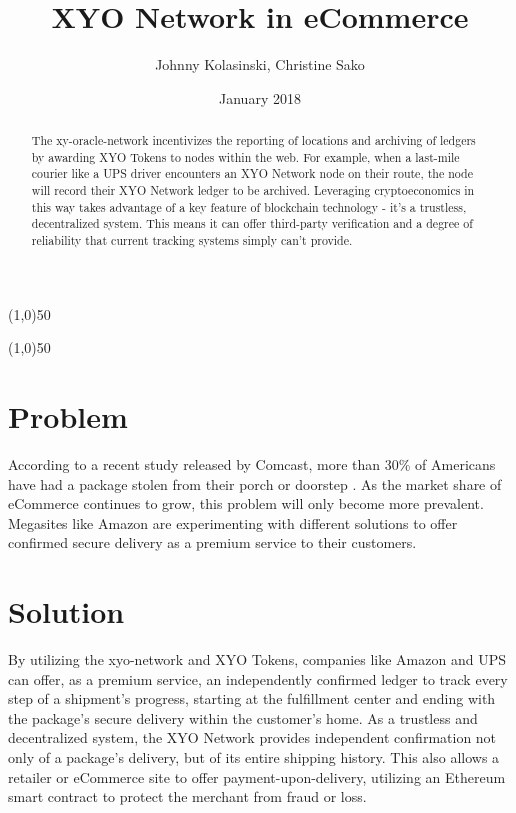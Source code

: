 \documentclass{article}
\title {XYO Network in eCommerce}
\author{Johnny Kolasinski, Christine Sako}
\date{January 2018}
\begin{document}
\maketitle
\tableofcontents

\begin{center}
\line(1,0){50}
\end{center}

\begin{abstract}
The \Gls{xy-oracle-network} incentivizes the reporting of locations and archiving of ledgers by awarding XYO Tokens to nodes within the web. For example, when a last-mile courier like a UPS driver encounters an XYO Network node on their route, the node will record their XYO Network ledger to be archived. Leveraging \gls{cryptoeconomics} in this way takes advantage of a key feature of blockchain technology - it's a \gls{trustless}, decentralized system. This means it can offer third-party verification and a degree of reliability that current tracking systems simply can't provide. 

\end{abstract}

\begin{center}
\line(1,0){50}
\end{center}

\section {Problem}
According to a recent study released by Comcast, more than 30\% of Americans have had a package stolen from their porch or doorstep \cite{comcast-packagesurvey}. As the market share of eCommerce continues to grow, this problem will only become more prevalent. Megasites like Amazon are experimenting with different solutions to offer confirmed secure delivery as a premium service to their customers.

\section {Solution}
By utilizing the \Gls{xyo-network} and XYO Tokens, companies like Amazon and UPS can offer, as a premium service, an independently confirmed ledger to track every step of a shipment's progress, starting at the fulfillment center and ending with the package's secure delivery within the customer's home. As a \gls{trustless} and decentralized system, the XYO Network provides independent confirmation not only of a package's delivery, but of its entire shipping history. This also allows a retailer or eCommerce site to offer payment-upon-delivery, utilizing an Ethereum smart contract to protect the merchant from fraud or loss.
\end{document}
